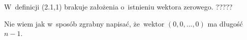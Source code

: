 \documentclass[a4paper,11pt]{article}
\begin{document}
\vspace{0em}



\vspace{0em}


\noindent
{} W~definicji (2.1,1) brakuje założenia o~istnieniu wektora zerowego. ?????

\vspace{\spaceFour}




\noindent
{} Nie wiem jak w~sposób zgrabny napisać, że~wektor
$( 0, 0, \ldots, 0 )$ ma długość $n - 1$.





\newpage

\end{document}
